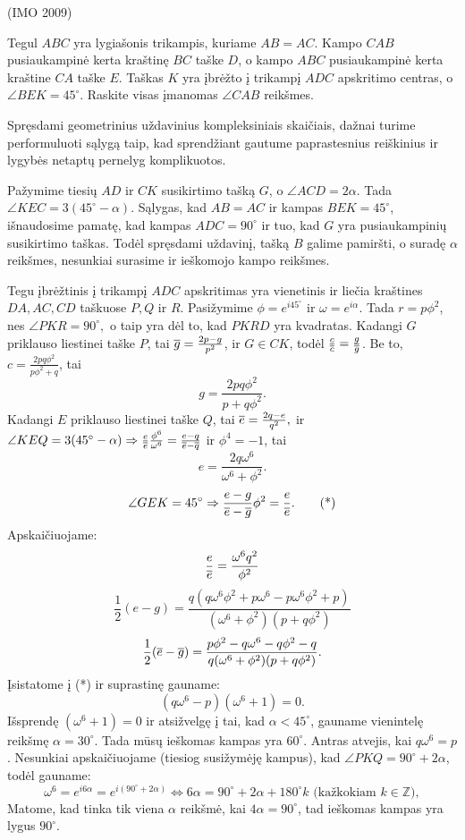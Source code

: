 \documentclass[11pt,a4paper,twoside]{book}
\begin{document}
\begin{pavnr}
(IMO 2009)

Tegul $ABC$ yra lygiašonis trikampis, kuriame $AB =
AC$. Kampo $CAB$ pusiaukampinė kerta kraštinę $BC$ taške $D$, o kampo
$ABC$ pusiaukampinė kerta kraštine $CA$ taške $E$. Taškas $K$ yra įbrėžto
į trikampį $ADC$ apskritimo centras, o $\angle BEK = 45^{\circ}$. Raskite visas
įmanomas $\angle CAB$ reikšmes.
\end{pavnr}
\begin{sprendimas}
Spręsdami geometrinius uždavinius kompleksiniais skaičiais, dažnai turime performuluoti sąlygą taip, kad sprendžiant gautume paprastesnius reiškinius ir lygybės netaptų pernelyg komplikuotos. 

Pažymime tiesių $AD$ ir $CK$ susikirtimo tašką $G$, o $\angle ACD = 2\alpha$. Tada $\angle KEC=3(45^{\circ}-\alpha).$ Sąlygas, kad $AB=AC$ ir kampas $BEK=45^\circ$, išnaudosime pamatę, kad kampas $ADC=90^\circ$ ir tuo, kad $G$ yra pusiaukampinių susikirtimo taškas. Todėl spręsdami uždavinį, tašką $B$ galime pamiršti, o suradę $\alpha$ reikšmes, nesunkiai surasime ir ieškomojo kampo reikšmes.

Tegu įbrėžtinis į trikampį $ADC$ apskritimas yra vienetinis ir liečia kraštines $DA, AC, CD$  taškuose $P, Q$ ir $R$. Pasižymime $\phi=e^{i45^{\circ}}$ ir $\omega=e^{i\alpha}$. Tada $r=p\phi^2$, nes $\angle PKR=90^{\circ},$ o taip yra dėl to, kad $PKRD$ yra kvadratas.
Kadangi $G$ priklauso liestinei taške $P$, tai $\overline{g}=\frac{2p-g}{p^2}$, ir $G\in CK$, todėl $\frac{c}{\overline{c}}=\frac{g}{\overline{g}}$. Be to, $c=\frac{2pq\phi^2}{p\phi^2+q}$, tai
$$g=\frac{2pq\phi ^2}{p+q\phi^2}.$$
Kadangi $E$ priklauso liestinei taške $Q$, tai $\overline{e}=\frac{2q-e}{q^2},$ ir $\angle KEQ=3(45^{\circ}-\alpha) \Rightarrow  \frac{e}{\overline{e}}\frac{\phi^6}{\omega^6}= \frac{e-q}{\overline{e}-\overline{q}}$ ir $\phi^4=-1$, tai
$$e=\frac{2q\omega^6}{\omega^6 +\phi ^2}.$$
\begin{equation*}
\angle GEK = 45^{\circ} \Rightarrow \frac{e-g}{\overline{e}-\overline{g}}\phi^2=\frac{e}{\overline{e}}.\tag{*}
\end{equation*}
Apskaičiuojame:
$$\frac{e}{\overline{e}}= \frac{\omega^6q^2}{\phi^2}$$
$$\frac{1}{2}(e-g)=\frac{q(q\omega^6\phi^2 +p\omega^6 -p\omega^6\phi^2 +p)}{(\omega^6+\phi^2)(p +q\phi^2)}$$
$$\frac{1}{2}(\overline{e}-\overline{g})=\frac{p\phi^2 -q\omega^6 -q\phi^2 - q}{q(\omega^6+\phi^2)(p +q\phi^2)}.$$
Įsistatome į (*) ir suprastinę gauname:
\begin{equation*}
(q\omega^6 -p)(\omega^6+1)=0. \tag{**}
\end{equation*}
Išsprendę $(\omega^6+1)=0$ ir atsižvelgę į tai, kad $ \alpha < 45^{\circ}$, gauname vienintelę reikšmę $\alpha = 30^{\circ}$. Tada mūsų ieškomas kampas yra $60^{\circ}$.
Antras atvejis, kai $q\omega^6 =p$. Nesunkiai apskaičiuojame (tiesiog susižymėję kampus), kad $\angle PKQ=90^{\circ} +2\alpha$, todėl gauname:
\begin{equation*}
\omega^6=e^{i6\alpha}=e^{i(90^{\circ} +2\alpha)} \Leftrightarrow 6\alpha=90^{\circ} +2\alpha +180^{\circ}k \text{ (kažkokiam } k\in \mathbb{Z}),
\end{equation*}
Matome, kad tinka tik viena $\alpha$ reikšmė, kai $4\alpha=90^{\circ}$, tad ieškomas kampas yra lygus $90^{\circ}$.


\end{sprendimas}
\end{document}
